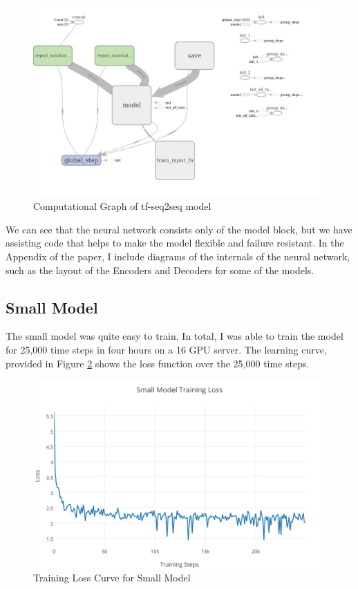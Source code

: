 \documentclass[pageno]{jpaper}
\begin{document}
\begin{figure}[H]
	\centering
	\includegraphics[scale=0.35]{example_graph.png}
	\caption{Computational Graph of tf-seq2seq model}
	\label{fg:exgraph}
\end{figure}

We can see that the neural network consists only of the model block, but we have assisting code that helps to make the model flexible and failure resistant.  In the Appendix of the paper, I include diagrams of the internals of the neural network, such as the layout of the Encoders and Decoders for some of the models.
\subsection{Small Model}
The small model was quite easy to train.  In total, I was able to train the model for 25,000 time steps in four hours on a 16 GPU server.  The learning curve, provided in Figure \ref{fg:small_loss} shows the loss function over the 25,000 time steps.

\begin{figure}[H]
	\centering
	\includegraphics[scale=0.85]{Small_Loss.pdf}
	\caption{Training Loss Curve for Small Model}
	\label{fg:small_loss}
\end{figure}
\end{document}
